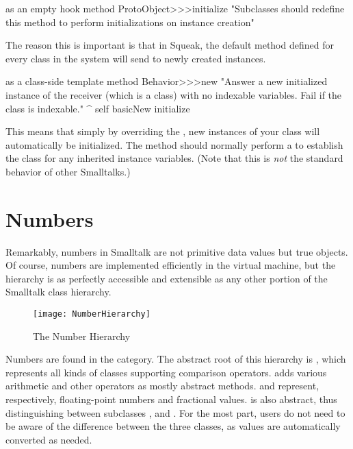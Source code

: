 \documentclass[a4paper,10pt,twoside]{book}
\begin{document}
\begin{method}{ as an empty hook method}
ProtoObject>>>initialize
    "Subclasses should redefine this method to perform initializations on instance creation"
\end{method}

The reason this is important is that in Squeak, the default  method defined for every class in the system will send  to newly created instances.

\begin{method}{ as a class-side template method}
Behavior>>>new
    "Answer a new initialized instance of the receiver (which is a class) with no indexable variables. Fail if the class is indexable."
    ^ self basicNew initialize
\end{method}

This means that simply by overriding the  , new instances of your class will automatically be initialized.
The  method should normally perform a  to establish the class  for any inherited instance variables.
(Note that this is \emph{not} the standard behavior of other Smalltalks.)

\section{Numbers}
\label{sec:Number}
Remarkably, numbers in Smalltalk are not primitive data values but true objects.
Of course, numbers are implemented efficiently in the virtual machine, but the  hierarchy is as perfectly accessible and extensible as any other portion of the Smalltalk class hierarchy.

\begin{figure}[ht]
\centerline {\texttt{[image: NumberHierarchy]}}
\caption{The Number Hierarchy \label{fig:numbers}}
\end{figure}

Numbers are found in the  category.
The abstract root of this hierarchy is , which represents all kinds of classes supporting comparison operators.
 adds various arithmetic and other operators as mostly abstract methods.  and  represent, respectively, floating-point numbers and fractional values.
 is also abstract, thus distinguishing between subclasses ,  and .
For the most part, users do not need to be aware of the difference between the three  classes, as values are automatically converted as needed.
\end{document}
